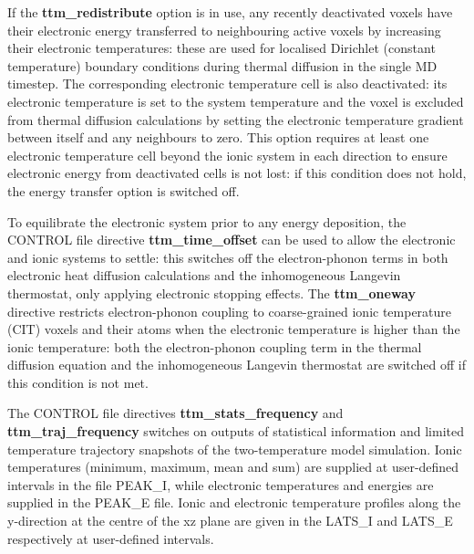 If the {\bf ttm\_redistribute} option is in use, any recently deactivated voxels
have their electronic energy transferred to neighbouring active voxels
by increasing their electronic temperatures: these are used for localised
Dirichlet (constant temperature) boundary conditions during thermal
diffusion in the single MD timestep. The corresponding electronic
temperature cell is also deactivated: its electronic temperature is set to
the system temperature and the voxel is excluded from thermal diffusion
calculations by setting the electronic temperature gradient between itself
and any neighbours to zero. This option requires at least one electronic
temperature cell beyond the ionic system in each direction to ensure
electronic energy from deactivated cells is not lost: if this condition
does not hold, the energy transfer option is switched off.

To equilibrate the electronic system prior to any energy deposition,
the CONTROL file directive {\bf ttm\_time\_offset} can be used to allow the
electronic and ionic systems to settle: this switches off the
electron-phonon terms in both electronic heat diffusion calculations
and the inhomogeneous Langevin thermostat, only applying
electronic stopping effects. The {\bf ttm\_oneway} directive restricts
electron-phonon coupling to coarse-grained ionic temperature (CIT)
voxels and their atoms when the electronic temperature is higher
than the ionic temperature: both the electron-phonon coupling term
in the thermal diffusion equation and the inhomogeneous Langevin
thermostat are switched off if this condition is not met.

The CONTROL file directives {\bf ttm\_stats\_frequency} and {\bf ttm\_traj\_frequency} switches
on outputs of statistical information and limited temperature trajectory
snapshots of the two-temperature model simulation. Ionic
temperatures (minimum, maximum, mean and sum) are supplied at
user-defined intervals in the file PEAK\_I, while electronic temperatures
and energies are supplied in the PEAK\_E file. Ionic and electronic
temperature profiles along the y-direction at the centre of the xz plane
are given in the LATS\_I and LATS\_E respectively at user-defined
intervals.


